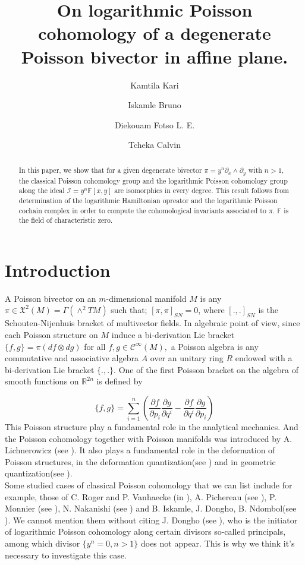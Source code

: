\documentclass[a4paper, 12pt,oneside,reqno]{amsart}
\title{On logarithmic Poisson cohomology of a degenerate Poisson bivector in affine plane.}
\author{Kamtila  Kari}
\author{Iskamle Bruno}
\author{Diekouam Fotso L. E.}
\author{Tcheka Calvin}
\theoremstyle{definition}
\begin{document}
%

\begin{abstract}
In this paper, we show that for a given degenerate bivector $\pi=y^n\partial_{x}\wedge \partial_{y}$ with $n>1$, the classical Poisson cohomology group and the logarithmic Poisson cohomology group along the ideal $\mathcal{I}=y^n\mathbb{F}[x,y]$ are isomorphics in every degree.  
This result follows from determination of the logarithmic Hamiltonian opreator and the logarithmic Poisson cochain complex  in order to compute the cohomological invariants associated to  $\pi$. $\mathbb{F}$ is the field of characteristic zero.
\end{abstract}
\maketitle
%
\section{Introduction}

A Poisson bivector on an $m$-dimensional manifold $M$ is any
$\pi\in\mathfrak{X}^2(M)=\Gamma(\wedge^2 TM)$  such that;
$[\pi,\pi]_{SN}=0$, where $[.,.]_{SN}$ is the Schouten-Nijenhuis bracket of
multivector fields. In algebraic point of view, since each Poisson
structure on $M$ induce a bi-derivation Lie bracket $\{f,
g\}=\pi(df\otimes dg)$ for all $f,g\in \mathcal{C}^\infty(M),$ a
Poisson algebra is any commutative and associative algebra $A$ over an
unitary ring $R$ endowed with a bi-derivation Lie bracket $\{.,.\}$. One of the first Poisson bracket on the algebra of smooth
functions on $\mathbb{R}^{2n}$ is defined by

\begin{equation}\label{E00}
 \{f,g\}=\underset{i=1}{\overset{n}\sum}(\dfrac{\partial f}{\partial p_i}\dfrac{\partial g}{\partial q^i}-\dfrac{\partial f}{\partial q^i}\dfrac{\partial g}{\partial p_i})
\end{equation}
     This Poisson structure play a fundamental role in the analytical mechanics.
  And the 
   Poisson cohomology together with Poisson manifolds was introduced by A. Lichnerowicz (see \cite{AL}). It also plays a fundamental role in the deformation of Poisson structures, in the deformation quantization(see \cite{FB}) and in geometric quantization(see \cite{DJ1}). \\
   
   Some studied cases of classical Poisson cohomology that we can list include for example, those of C. Roger and P. Vanhaecke (in \cite{CRPV}), A. Pichereau (see \cite{PA}), P. Monnier (see \cite{PM}), 	N. Nakanishi (see \cite{NN}) and B. Iskamle, J. Dongho, B. Ndombol(see \cite{BI}). We cannot mention them without citing J. Dongho (see \cite{DJ1}), who is the initiator of logarithmic Poisson cohomology along certain divisors so-called principals, among which divisor $\{y^n=0, n>1\}$ does not appear. This is why we think it's necessary to investigate this case.\\
   
\end{document}
